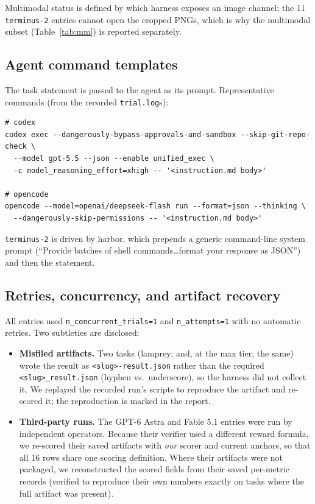 Multimodal status is defined by which harness exposes an image channel; the 11 \texttt{terminus-2} entries cannot open the cropped PNGs, which is why the multimodal subset (Table~\ref{tab:mm}) is reported separately.

\subsection{Agent command templates}
The task statement is passed to the agent as its prompt. Representative commands (from the recorded \texttt{trial.log}s):
\begin{verbatim}
# codex
codex exec --dangerously-bypass-approvals-and-sandbox --skip-git-repo-check \
  --model gpt-5.5 --json --enable unified_exec \
  -c model_reasoning_effort=xhigh -- '<instruction.md body>'

# opencode
opencode --model=openai/deepseek-flash run --format=json --thinking \
  --dangerously-skip-permissions -- '<instruction.md body>'
\end{verbatim}
\texttt{terminus-2} is driven by harbor, which prepends a generic command-line
system prompt (``Provide batches of shell commands\ldots format your response as
JSON'') and then the statement.

\subsection{Retries, concurrency, and artifact recovery}
All entries used \texttt{n\_concurrent\_trials=1} and \texttt{n\_attempts=1} with
no automatic retries. Two subtleties are disclosed:
\begin{itemize}[leftmargin=1.4em,itemsep=1pt]
\item \textbf{Misfiled artifacts.} Two tasks (lamprey; and, at the max tier, the
same) wrote the result as \texttt{<slug>-result.json} rather than the required
\texttt{<slug>\_result.json} (hyphen vs.\ underscore), so the harness did not
collect it. We replayed the recorded run's scripts to reproduce the artifact and
re-scored it; the reproduction is marked in the report.
\item \textbf{Third-party runs.} The GPT-6 Astra and Fable 5.1 entries were run
by independent operators. Because their verifier used a different reward
formula, we re-scored their saved artifacts with \emph{our} scorer and current
anchors, so that all 16 rows share one scoring definition. Where their artifacts
were not packaged, we reconstructed the scored fields from their saved
per-metric records (verified to reproduce their own numbers exactly on tasks
where the full artifact was present).
\end{itemize}

